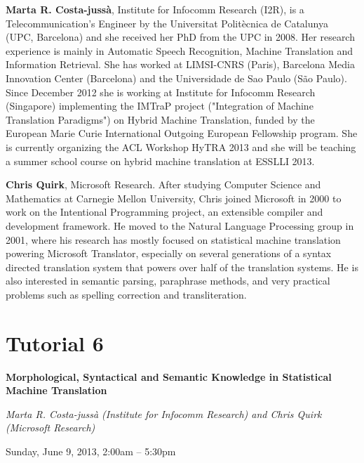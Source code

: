 \begin{bio}
\noindent
{\bfseries Marta R. Costa-jussà}, Institute for Infocomm Research (I2R), is a Telecommunication's Engineer by the Universitat Politècnica de Catalunya (UPC, Barcelona) and she received her PhD from the UPC in 2008. Her research experience is mainly in Automatic Speech Recognition, Machine Translation and Information Retrieval. She has worked at LIMSI-CNRS (Paris), Barcelona Media Innovation Center (Barcelona) and the Universidade de Sao Paulo (São Paulo). Since December 2012 she is working at Institute for Infocomm Research (Singapore) implementing the IMTraP project ("Integration of Machine Translation Paradigms") on Hybrid Machine Translation, funded by the European Marie Curie International Outgoing European Fellowship program. She is currently organizing the ACL Workshop HyTRA 2013 and she will be teaching a summer school course on hybrid machine translation at ESSLLI 2013.

\noindent
{\bfseries Chris Quirk}, Microsoft Research. After studying Computer Science and Mathematics at Carnegie Mellon University, Chris joined Microsoft in 2000 to work on the Intentional Programming project, an extensible compiler and development framework. He moved to the Natural Language Processing group in 2001, where his research has mostly focused on statistical machine translation powering Microsoft Translator, especially on several generations of a syntax directed translation system that powers over half of the translation systems. He is also interested in semantic parsing, paraphrase methods, and very practical problems such as spelling correction and transliteration.
\end{bio}

\section%
    [\textbf{T6:} Morphological, Syntactical and Semantic Knowledge in Statistical Machine Translation (M.~R. Costa-juss\`{a} and C. Quirk)]
    {Tutorial 6}
\label{TutF}
\begin{center}
\begin{Large}
\bfseries Morphological, Syntactical and Semantic Knowledge in Statistical Machine Translation\\ \vspace{2em}\par
\end{Large}

{\itshape Marta R. Costa-juss\`{a} (Institute for Infocomm Research) and Chris Quirk (Microsoft Research)}\vspace{1em}\par
Sunday, June 9, 2013, 2:00am -- 5:30pm \vspace{1em}\\
\TutLocF
\end{center}

